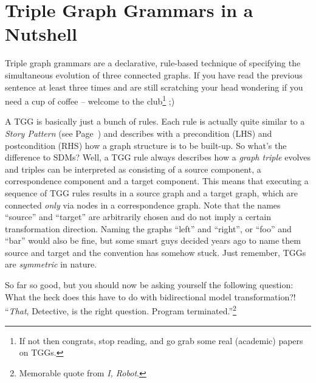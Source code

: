 \section{Triple Graph Grammars in a Nutshell}

Triple graph grammars are a declarative, rule-based technique of specifying the simultaneous evolution of three connected graphs.
If you have read the previous sentence at least three times and are still scratching your head wondering if you need a cup of coffee -- welcome to the club\footnote{If not then congrats, stop reading, and go grab some real (academic) papers on TGGs.} ;)

A TGG is basically just a bunch of rules.
Each rule is actually quite similar to a \emph{Story Pattern} (see Page~\pageref{story-pattern}) and describes with a precondition (LHS) and postcondition (RHS) how a graph structure is to be built-up.
So what's the difference to SDMs?  
Well, a TGG rule always describes how a \emph{graph triple} evolves and triples can be interpreted as consisting of a source component, a correspondence component and a target component.
This means that executing a sequence of TGG rules results in a source graph and a target graph, which are connected \emph{only} via nodes in a correspondence graph.
Note that the names ``source'' and ``target'' are arbitrarily chosen and do not imply a certain transformation direction.
Naming the graphs ``left'' and ``right'', or ``foo'' and ``bar'' would also be fine, but some smart guys decided years ago to name them source and target and the convention has somehow stuck.
Just remember, TGGs are \emph{symmetric} in nature. 

So far so good, but you should now be asking yourself the following question: What the {\huge heck} does this have to do with bidirectional model transformation?!  ``\emph{That}, Detective, is the right question. Program terminated.''\footnote{Memorable quote from \emph{I, Robot}.}

